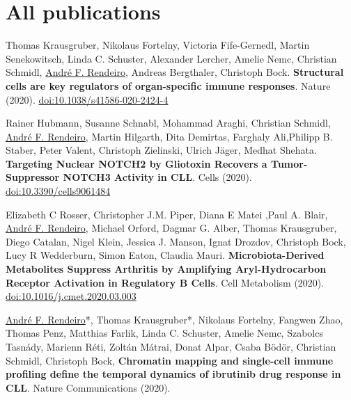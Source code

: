 \documentclass[11pt,a4paper,roman]{moderncv} %
\begin{document}
\newpage

\section{All publications}
        \begin{etaremune}[leftmargin=1.0cm, itemindent=0pt, topsep=10pt, itemsep=2pt, partopsep=0pt, parsep=0pt]
        \item Thomas Krausgruber, Nikolaus Fortelny, Victoria Fife-Gernedl, Martin Senekowitsch, Linda C. Schuster, Alexander Lercher, Amelie Nemc, Christian Schmidl, \underline{André F. Rendeiro}, Andreas Bergthaler, Christoph Bock. \textbf{Structural cells are key regulators of organ-specific immune responses}. Nature (2020).
        \href{https://dx.doi.org/10.1038/s41586-020-2424-4}{doi:10.1038/s41586-020-2424-4}
        \item Rainer Hubmann, Susanne Schnabl, Mohammad Araghi, Christian Schmidl, \underline{André F. Rendeiro}, Martin Hilgarth, Dita Demirtas, Farghaly Ali,Philipp B. Staber, Peter Valent, Christoph Zielinski, Ulrich Jäger, Medhat Shehata. \textbf{Targeting Nuclear NOTCH2 by Gliotoxin Recovers a Tumor-Suppressor NOTCH3 Activity in CLL}. Cells (2020).
        \href{http://dx.doi.org/10.3390/cells9061484}{doi:10.3390/cells9061484}
        \item Elizabeth C Rosser, Christopher J.M. Piper, Diana E Matei ,Paul A. Blair, \underline{André F. Rendeiro}, Michael Orford, Dagmar G. Alber, Thomas Krausgruber, Diego Catalan, Nigel Klein, Jessica J. Manson, Ignat Drozdov, Christoph Bock, Lucy R Wedderburn, Simon Eaton, Claudia Mauri. \textbf{Microbiota-Derived Metabolites Suppress Arthritis by Amplifying Aryl-Hydrocarbon Receptor Activation in Regulatory B Cells}. Cell Metabolism (2020).
        \href{https://dx.doi.org/10.1016/j.cmet.2020.03.003}{doi:10.1016/j.cmet.2020.03.003}
        \item \underline{André F. Rendeiro}*, Thomas Krausgruber*, Nikolaus Fortelny, Fangwen Zhao, Thomas Penz, Matthias Farlik, Linda C. Schuster, Amelie Nemc, Szabolcs Tasnády, Marienn Réti, Zoltán Mátrai, Donat Alpar, Csaba Bödör, Christian Schmidl, Christoph Bock, \textbf{Chromatin mapping and single-cell immune profiling define the temporal dynamics of ibrutinib drug response in CLL}. Nature Communications (2020).

\end{etaremune}
\end{document}
